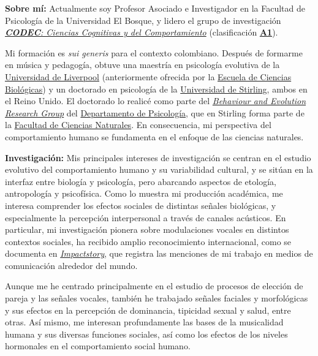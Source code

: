 \documentclass[11pt,a4paper,]{awesome-cv}
\begin{document}
\begin{footnotesize}

\textbf{Sobre mí:} Actualmente soy Profesor Asociado e Investigador en la Facultad de Psicología de la Universidad El Bosque, y lidero el grupo de investigación \href{https://investigaciones.unbosque.edu.co/codec}{\textit{\textbf{CODEC}: Ciencias Cognitivas y del Comportamiento}} (clasificación \textbf{\href{https://scienti.minciencias.gov.co/gruplac/jsp/visualiza/visualizagr.jsp?nro=00000000001446}{A1}}). 

Mi formación es \textit{sui generis} para el contexto colombiano. Después de formarme en música y pedagogía, obtuve una maestría en psicología evolutiva de la \href{https://www.liverpool.ac.uk/}{Universidad de Liverpool} (anteriormente ofrecida por la \href{https://www.liverpool.ac.uk/life-sciences/}{Escuela de Ciencias Biológicas}) y un doctorado en psicología de la \href{https://www.stir.ac.uk/}{Universidad de Stirling}, ambos en el Reino Unido. El doctorado lo realicé como parte del \textit{\href{https://www.stir.ac.uk/about/faculties/natural-sciences/our-research/research-groups/behaviour-and-evolution-research-group/}{Behaviour and Evolution Research Group}} del \href{https://www.stir.ac.uk/about/faculties/natural-sciences/psychology/}{Departamento de Psicología}, que en Stirling forma parte de la \href{https://www.stir.ac.uk/about/faculties/natural-sciences/departments/}{Facultad de Ciencias Naturales}. En consecuencia, mi perspectiva del comportamiento humano se fundamenta en el enfoque de las ciencias naturales.

\textbf{Investigación:} Mis principales intereses de investigación se centran en el estudio evolutivo del comportamiento humano y su variabilidad cultural, y se sitúan en la interfaz entre biología y psicología, pero abarcando aspectos de etología, antropología y psicofísica. Como lo muestra mi producción académica, me interesa comprender los efectos sociales de distintas señales biológicas, y especialmente la percepción interpersonal a través de canales acústicos. En particular, mi investigación pionera sobre modulaciones vocales en distintos contextos sociales, ha recibido amplio reconocimiento internacional, como se documenta en \href{https://profiles.impactstory.org/u/0000-0002-0092-6298}{\textit{Impactstory}}, que registra las menciones de mi trabajo en medios de comunicación alrededor del mundo.

Aunque me he centrado principalmente en el estudio de procesos de elección de pareja y las señales vocales, también he trabajado señales faciales y morfológicas y sus efectos en la percepción de dominancia, tipicidad sexual y salud, entre otras. Así mismo, me interesan profundamente las bases de la musicalidad humana y sus diversas funciones sociales, así como los efectos de los niveles hormonales en el comportamiento social humano.


\end{footnotesize}
\end{document}
